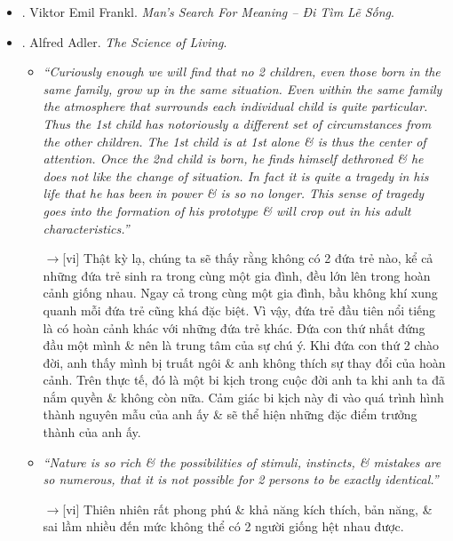 \documentclass[12pt,oneside]{book}
\begin{document}
\begin{itemize}
\begin{itemize}
		{\sf[en]$\to$[vi]} Nếu cuộc sống có ý nghĩa gì đó thì đau khổ cũng phải có ý nghĩa. Đau khổ là một phần không thể xóa bỏ được của cuộc sống, kể cả số phận \& cái chết. Không có đau khổ \& cái chết, cuộc sống con người không thể trọn vẹn.
	\end{itemize}
	Với bản dịch tiếng Việt:
	\item \cite{Frankl_meaning_VN}. {\sc Viktor Emil Frankl}. {\it Man's Search For Meaning -- Đi Tìm Lẽ Sống}.
	\item \cite{Adler_science_living}. {\sc Alfred Adler}. {\it The Science of Living}.
	\begin{itemize}
		\item {\it``Curiously enough we will find that no 2 children, even those born in the same family, grow up in the same situation. Even within the same family the atmosphere that surrounds each individual child is quite particular. Thus the 1st child has notoriously a different set of circumstances from the other children. The 1st child is at 1st alone \& is thus the center of attention. Once the 2nd child is born, he finds himself dethroned \& he does not like the change of situation. In fact it is quite a tragedy in his life that he has been in power \& is so no longer. This sense of tragedy goes into the formation of his prototype \& will crop out in his adult characteristics.''}
		
		{\sf[en]$\to$[vi]} Thật kỳ lạ, chúng ta sẽ thấy rằng không có 2 đứa trẻ nào, kể cả những đứa trẻ sinh ra trong cùng một gia đình, đều lớn lên trong hoàn cảnh giống nhau. Ngay cả trong cùng một gia đình, bầu không khí xung quanh mỗi đứa trẻ cũng khá đặc biệt. Vì vậy, đứa trẻ đầu tiên nổi tiếng là có hoàn cảnh khác với những đứa trẻ khác. Đứa con thứ nhất đứng đầu một mình \& nên là trung tâm của sự chú ý. Khi đứa con thứ 2 chào đời, anh thấy mình bị truất ngôi \& anh không thích sự thay đổi của hoàn cảnh. Trên thực tế, đó là một bi kịch trong cuộc đời anh ta khi anh ta đã nắm quyền \& không còn nữa. Cảm giác bi kịch này đi vào quá trình hình thành nguyên mẫu của anh ấy \& sẽ thể hiện những đặc điểm trưởng thành của anh ấy.
		
		\item {\it``Nature is so rich \& the possibilities of stimuli, instincts, \& mistakes are so numerous, that it is not possible for 2 persons to be exactly identical.''}
		
		{\sf[en]$\to$[vi]} Thiên nhiên rất phong phú \& khả năng kích thích, bản năng, \& sai lầm nhiều đến mức không thể có 2 người giống hệt nhau được.
		

\end{itemize}
\end{itemize}
\end{document}
